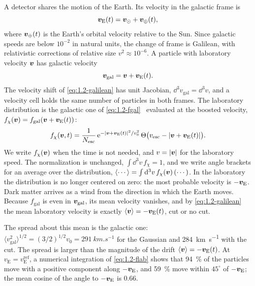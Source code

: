A detector shares the motion of the Earth. Its velocity in the galactic frame is
\begin{equation}
  \bm{v}_{\mathrm{E}}(t) = \bm{v}_{\odot} + \bm{v}_{\oplus}(t),
  \label{eq:1.2-vE}
\end{equation}
where $\bm{v}_{\oplus}(t)$ is the Earth's orbital velocity relative to the Sun. Since galactic speeds are below $10^{-2}$ in natural units, the change of frame is Galilean, with relativistic corrections of relative size $v^2 \approx 10^{-6}$. A particle with laboratory velocity $\bm{v}$ has galactic velocity
\begin{equation}
  \bm{v}_{\mathrm{gal}} = \bm{v} + \bm{v}_{\mathrm{E}}(t).
  \label{eq:1.2-galilean}
\end{equation}
The velocity shift of \cref{eq:1.2-galilean} has unit Jacobian, $\dd^3 v_{\mathrm{gal}} = \dd^3 v$, and a velocity cell holds the same number of particles in both frames. The laboratory distribution is the galactic one of \cref{eq:1.2-fgal}~\cite[Eq.~(10)]{baxter2021recommended} evaluated at the boosted velocity, $f_\chi(\bm{v}) = f_{\mathrm{gal}}(\bm{v} + \bm{v}_{\mathrm{E}}(t))$:
\begin{equation}
  f_\chi(\bm{v}, t) = \frac{1}{N_{\mathrm{esc}}}\, \mathrm{e}^{-|\bm{v} + \bm{v}_{\mathrm{E}}(t)|^2/v_0^2}\, \Theta\bigl(v_{\mathrm{esc}} - |\bm{v} + \bm{v}_{\mathrm{E}}(t)|\bigr).
  \label{eq:1.2-flab}
\end{equation}
We write $f_\chi(\bm{v})$ when the time is not needed, and $v = |\bm{v}|$ for the laboratory speed. The normalization is unchanged, $\int\dd^3 v\, f_\chi = 1$, and we write angle brackets for an average over the distribution, $\langle\cdots\rangle = \int \mathrm{d}^3 v\, f_\chi(\bm{v})\,(\cdots)$. In the laboratory the distribution is no longer centered on zero: the most probable velocity is $-\bm{v}_{\mathrm{E}}$. Dark matter arrives as a wind from the direction in which the Earth moves. Because $f_{\mathrm{gal}}$ is even in $\bm{v}_{\mathrm{gal}}$, its mean velocity vanishes, and by \cref{eq:1.2-galilean} the mean laboratory velocity is exactly $\langle\bm{v}\rangle = -\bm{v}_{\mathrm{E}}(t)$, cut or no cut.

The spread about this mean is the galactic one: $\langle v_{\mathrm{gal}}^2\rangle^{1/2} = (3/2)^{1/2} v_0 = \SI{291}{km.s^{-1}}$ for the Gaussian and \SI{284}{km.s^{-1}} with the cut. The spread is larger than the magnitude of the drift $\langle\bm{v}\rangle = -\bm{v}_{\mathrm{E}}(t)$. At $v_{\mathrm{E}} = v_{\mathrm{E}}^{\mathrm{ref}}$, a numerical integration of \cref{eq:1.2-flab} shows that \SI{94}{\percent} of the particles move with a positive component along $-\bm{v}_{\mathrm{E}}$, and \SI{59}{\percent} move within $45^\circ$ of $-\bm{v}_{\mathrm{E}}$; the mean cosine of the angle to $-\bm{v}_{\mathrm{E}}$ is 0.66.

